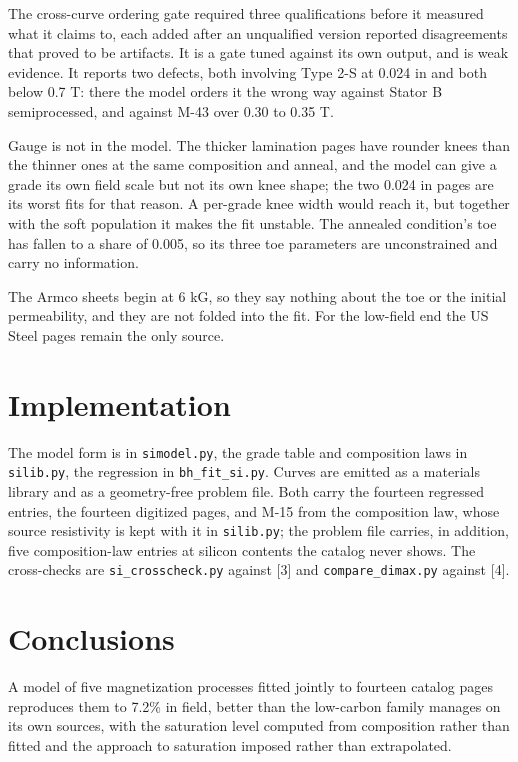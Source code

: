 \documentclass[
  11pt,
]{article}
\begin{document}
The cross-curve ordering gate required three qualifications before it measured what it claims to, each added after an unqualified version reported disagreements that proved to be artifacts. It is a gate tuned against its own output, and is weak evidence. It reports two defects, both involving Type 2-S at 0.024 in and both below 0.7 T: there the model orders it the wrong way against Stator B semiprocessed, and against M-43 over 0.30 to 0.35 T.

Gauge is not in the model. The thicker lamination pages have rounder knees than the thinner ones at the same composition and anneal, and the model can give a grade its own field scale but not its own knee shape; the two 0.024 in pages are its worst fits for that reason. A per-grade knee width would reach it, but together with the soft population it makes the fit unstable. The annealed condition's toe has fallen to a share of 0.005, so its three toe parameters are unconstrained and carry no information.

The Armco sheets begin at 6 kG, so they say nothing about the toe or the initial permeability, and they are not folded into the fit. For the low-field end the US Steel pages remain the only source.

\section{Implementation}\label{implementation}

The model form is in \texttt{simodel.py}, the grade table and composition laws in \texttt{silib.py}, the regression in \texttt{bh\_fit\_si.py}. Curves are emitted as a materials library and as a geometry-free problem file. Both carry the fourteen regressed entries, the fourteen digitized pages, and M-15 from the composition law, whose source resistivity is kept with it in \texttt{silib.py}; the problem file carries, in addition, five composition-law entries at silicon contents the catalog never shows. The cross-checks are \texttt{si\_crosscheck.py} against {[}3{]} and \texttt{compare\_dimax.py} against {[}4{]}.

\section{Conclusions}\label{conclusions}

A model of five magnetization processes fitted jointly to fourteen catalog pages reproduces them to 7.2\% in field, better than the low-carbon family manages on its own sources, with the saturation level computed from composition rather than fitted and the approach to saturation imposed rather than extrapolated.
\end{document}
